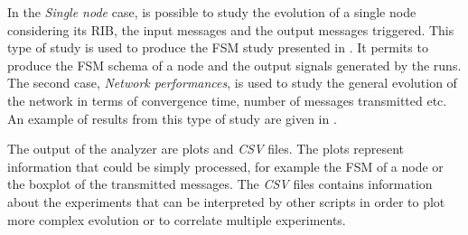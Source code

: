 In the \textit{Single node} case, is possible to study the evolution of a single
node considering its \ac{RIB}, the input messages and the output messages triggered.
This type of study is used to produce the \ac{FSM} study presented in .
It permits to produce the \ac{FSM} schema of a node and the output signals
generated by the runs.
The second case, \textit{Network performances}, is used to study the general
evolution of the network in terms of convergence time, number of messages
transmitted etc.
An example of results from this type of study are given in .

The output of the analyzer are plots and \textit{CSV} files.
The plots represent information that could be simply processed, for example
the \ac{FSM} of a node or the boxplot of the transmitted messages.
The \textit{CSV} files contains information about the experiments that can be
interpreted by other scripts in order to plot more complex evolution or to
correlate multiple experiments.


